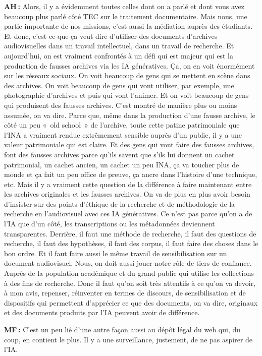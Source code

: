 \textbf{AH :} Alors, il y a évidemment toutes celles dont on a parlé et dont vous avez beaucoup plus parlé côté TEC sur le traitement documentaire. Mais nous, une partie importante de nos missions, c'est aussi la médiation auprès des étudiants. Et donc, c'est ce que ça veut dire d'utiliser des documents d'archives audiovisuelles dans un travail intellectuel, dans un travail de recherche.  Et aujourd'hui, on est vraiment confrontés à un défi qui est majeur qui est la production de fausses archives via les IA génératives. Ça, on en voit énormément sur les réseaux sociaux. On voit beaucoup de gens qui se mettent en scène dans des archives. On voit beaucoup de gens qui vont utiliser, par exemple, une photographie d'archives et puis qui vont l'animer. Et on voit beaucoup de gens qui produisent des fausses archives. C'est montré de manière plus ou moins assumée, on va dire. Parce que, même dans la production d'une fausse archive, le côté un peu « old school » de l'archive, toute cette patine patrimoniale que l'INA a vraiment rendue extrêmement sensible auprès d'un public, il y a une valeur patrimoniale qui est claire. Et des gens qui vont faire des fausses archives, font des fausses archives parce qu'ils savent que s'ils lui donnent un cachet patrimonial, un cachet ancien, un cachet un peu INA, ça va toucher plus de monde et ça fait un peu office de preuve, ça ancre dans l'histoire d'une technique, etc. Mais il y a vraiment cette question de la différence à faire maintenant entre les archives originales et les fausses archives. On va de plus en plus avoir besoin d'insister sur des points d'éthique de la recherche et de méthodologie de la recherche en l'audiovisuel avec ces IA génératives. Ce n'est pas parce qu'on a de l'IA que d'un côté, les transcriptions ou les métadonnées deviennent transparentes. Derrière, il faut une méthode de recherche, il faut des questions de recherche, il faut des hypothèses, il faut des corpus, il faut faire des choses dans le bon ordre. Et il faut faire aussi le même travail de sensibilisation sur un document audiovisuel. Nous, on doit aussi jouer notre rôle de tiers de confiance. Auprès de la population académique et du grand public qui utilise les collections à des fins de recherche. Donc il faut qu'on soit très attentifs à ce qu'on va devoir, à mon avis, repenser, réinventer en termes de discours, de sensibilisation et de dispositifs qui permettent d'apprécier ce que des documents, on va dire, originaux et des documents produits par l'IA peuvent avoir de différence.

\textbf{MF :} C’est un peu lié d'une autre façon aussi au dépôt légal du web qui, du coup, en contient le plus. Il y a une surveillance, justement, de ne pas aspirer de l'IA. 

